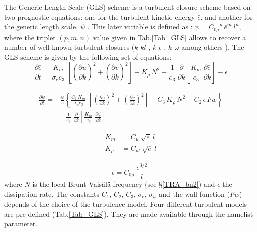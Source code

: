 \documentclass[NEMO_book]{subfiles}
\begin{document}
The Generic Length Scale (GLS) scheme is a turbulent closure scheme based on 
two prognostic equations: one for the turbulent kinetic energy $\bar {e}$, and another 
for the generic length scale, $\psi$ \citep{Umlauf_Burchard_JMS03, Umlauf_Burchard_CSR05}. 
This later variable is defined as : $\psi = {C_{0\mu}}^{p} \ {\bar{e}}^{m} \ l^{n}$, 
where the triplet $(p, m, n)$ value given in Tab.\ref{Tab_GLS} allows to recover 
a number of well-known turbulent closures ($k$-$kl$ \citep{Mellor_Yamada_1982}, 
$k$-$\epsilon$ \citep{Rodi_1987}, $k$-$\omega$ \citep{Wilcox_1988} 
among others \citep{Umlauf_Burchard_JMS03,Kantha_Carniel_CSR05}). 
The GLS scheme is given by the following set of equations:
\begin{equation} \label{Eq_zdfgls_e}
\frac{\partial \bar{e}}{\partial t} = 
\frac{K_m}{\sigma_e e_3 }\;\left[ {\left( \frac{\partial u}{\partial k} \right)^2
                                                   +\left( \frac{\partial v}{\partial k} \right)^2} \right]
-K_\rho \,N^2
+\frac{1}{e_3}\,\frac{\partial}{\partial k} \left[ \frac{K_m}{e_3}\,\frac{\partial \bar{e}}{\partial k} \right]
- \epsilon
\end{equation}

\begin{equation} \label{Eq_zdfgls_psi}
   \begin{split}
\frac{\partial \psi}{\partial t} =& \frac{\psi}{\bar{e}} \left\{
\frac{C_1\,K_m}{\sigma_{\psi} {e_3}}\;\left[ {\left( \frac{\partial u}{\partial k} \right)^2
                                                                   +\left( \frac{\partial v}{\partial k} \right)^2} \right]
- C_3 \,K_\rho\,N^2   - C_2 \,\epsilon \,Fw   \right\}             \\
&+\frac{1}{e_3}  \;\frac{\partial }{\partial k}\left[ {\frac{K_m}{e_3 }
                                  \;\frac{\partial \psi}{\partial k}} \right]\;
   \end{split}
\end{equation}

\begin{equation} \label{Eq_zdfgls_kz}
   \begin{split}
         K_m    &= C_{\mu} \ \sqrt {\bar{e}} \ l         \\
         K_\rho &= C_{\mu'}\ \sqrt {\bar{e}} \ l
   \end{split}
\end{equation}

\begin{equation} \label{Eq_zdfgls_eps}
{\epsilon} = C_{0\mu} \,\frac{\bar {e}^{3/2}}{l} \;
\end{equation}
where $N$ is the local Brunt-Vais\"{a}l\"{a} frequency (see \S\ref{TRA_bn2}) 
and $\epsilon$ the dissipation rate. 
The constants $C_1$, $C_2$, $C_3$, ${\sigma_e}$, ${\sigma_{\psi}}$ and the wall function ($Fw$) 
depends of the choice of the turbulence model. Four different turbulent models are pre-defined 
(Tab.\ref{Tab_GLS}). They are made available through the  namelist parameter. 
\end{document}
